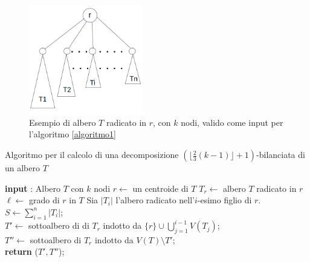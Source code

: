 	\begin{figure}[htbp]
	\centering
	\includegraphics[width=5cm]{capitolo3/grafo3}
	\caption{Esempio di albero $ T $ radicato in $ r $, con $ k $ nodi, valido come input per l'algoritmo \ref{algoritmo1}} 
	\label{fig:3} %
\end{figure}

\begin{algorithm}[H]
	\label{algoritmo1}
	\SetAlgoLined
	\caption{Algoritmo per il calcolo di una decomposizione $ (\lfloor \frac{2}{3}(k-1) \rfloor + 1)$-bilanciata di un albero $T$ }
	\textbf{input} : Albero $ T $ con $ k $ nodi\;
	$r \gets $ un centroide di $T$\;
	$T_r \gets $ albero $T$ radicato in $r$\;
	$\ell \gets$ grado di $r$ in $T$\; 
	Sia $ |T_i| $ l'albero radicato nell'$ i $-esimo figlio di $ r $.\;
	$ S \gets \sum_{i=1}^{n}|T_i| $;\\
	{
		{
			$ T'\gets $ sottoalbero di  di $ T_r $ indotto da $ \{r\} \cup \bigcup_{j=1}^{i-1}V(T_j)$;\\ %
			$ T'' \gets $ sottoalbero di $ T_r $ indotto da $ V(T) \setminus T'$;\\ %
			\textbf{return} ($ T',T'' $);\\
		}	 
}
\end{algorithm}




